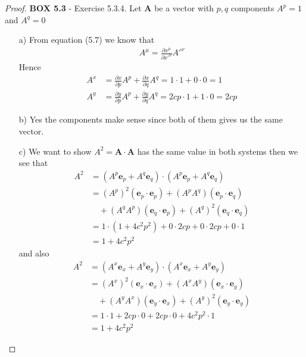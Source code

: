 \documentclass[11pt]{article}
\theoremstyle{definition}
\begin{document}
\begin{proof}{\textbf{BOX 5.3} - Exercise 5.3.4.}
    Let $\bm{A}$ be a vector with $p,q$ components $A^p = 1$ and $A^q = 0$
    \begin{itemize}
    \item [a)] From equation (5.7) we know that
    \begin{align*}
        A^{\mu} = \frac{\partial x^{\mu}}{\partial x'^{\nu}} A'^{\nu}
    \end{align*}
    Hence
    \begin{align*}
        A^x &=
        \frac{\partial x}{\partial p}A^p + \frac{\partial x}{\partial q}A^q
        = 1 \cdot 1 + 0 \cdot 0 = 1\\
        A^y &=
        \frac{\partial y}{\partial p}A^p + \frac{\partial y}{\partial q}A^q
        = 2cp \cdot 1 + 1 \cdot 0 = 2cp
    \end{align*}

    \item[b)] Yes the components make sense since both of them gives us the
    same vector.

    \item[c)] We want to show $A^2 = \bm{A} \cdot \bm{A}$
    has the same value in both systems then we see that
    \begin{align*}
        A^2 &= (A^p\bm{e}_p + A^q\bm{e}_q)\cdot(A^p\bm{e}_p + A^q\bm{e}_q)\\
        &= (A^p)^2(\bm{e}_p \cdot\bm{e}_p) + (A^pA^q)(\bm{e}_p \cdot \bm{e}_q)\\
        &\quad+ (A^qA^p)(\bm{e}_q \cdot \bm{e}_p) + (A^q)^2(\bm{e}_q \cdot\bm{e}_q)\\
        &= 1 \cdot (1 + 4c^2p^2) + 0 \cdot 2cp + 0 \cdot 2cp + 0 \cdot 1\\
        &= 1 + 4c^2p^2
    \end{align*}
    and also
    \begin{align*}
        A^2 &= (A^x\bm{e}_x + A^y\bm{e}_y)\cdot(A^x\bm{e}_x + A^y\bm{e}_y)\\
        &= (A^x)^2(\bm{e}_x \cdot\bm{e}_x) + (A^xA^y)(\bm{e}_x \cdot \bm{e}_y)\\
        &\quad+ (A^yA^x)(\bm{e}_y \cdot \bm{e}_x) + (A^y)^2(\bm{e}_y \cdot\bm{e}_y)\\
        &= 1 \cdot 1 + 2cp \cdot 0 + 2cp \cdot 0 + 4c^2p^2 \cdot 1\\
        &= 1 + 4c^2p^2
    \end{align*}
    \end{itemize}
\end{proof}
\end{document}

